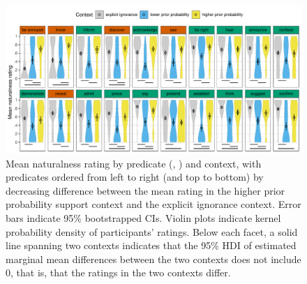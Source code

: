 \documentclass[11pt,fleqn]{article}
\newcommand{\6}{\mbox{$[\hspace*{-.6mm}[$}}
\newcommand{\9}{\mbox{$]\hspace*{-.6mm}]$}}
\begin{document}
\begin{figure}[h!]
\centering
\includegraphics[width=\textwidth]{../../../results/main/graphs/naturalness-by-context-and-predicate-with-stats}
\caption{Mean naturalness rating by predicate (, ) and context, with predicates ordered from left to right (and top to bottom) by decreasing difference between the mean rating in the higher prior probability support context and the explicit ignorance context. Error bars indicate 95\% bootstrapped CIs. Violin plots indicate kernel probability density of participants' ratings. Below each facet, a solid line spanning two contexts indicates that the 95\% HDI of estimated marginal mean differences between the two contexts does not include 0, that is, that the ratings in the two contexts differ.}\label{fig:acc-by-context}
\end{figure}

\end{document}
